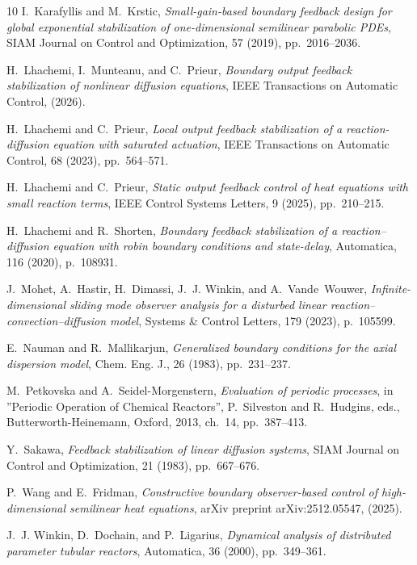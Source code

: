 \documentclass{mpi2015-cscpreprint}
\numberwithin{equation}{section}
\begin{document}
\begin{thebibliography}{10}
{I.~Karafyllis and M.~Krstic}, {\em Small-gain-based boundary feedback
  design for global exponential stabilization of one-dimensional semilinear
  parabolic {PDEs}}, SIAM Journal on Control and Optimization, 57 (2019),
  pp.~2016--2036.

{H.~Lhachemi, I.~Munteanu, and C.~Prieur}, {\em Boundary output feedback
  stabilization of nonlinear diffusion equations}, IEEE Transactions on
  Automatic Control,  (2026).

{H.~Lhachemi and C.~Prieur}, {\em Local output feedback stabilization of a
  reaction-diffusion equation with saturated actuation}, IEEE Transactions on
  Automatic Control, 68 (2023), pp.~564--571.

{H.~Lhachemi and C.~Prieur}, {\em Static output
  feedback control of heat equations with small reaction terms}, IEEE Control
  Systems Letters, 9 (2025), pp.~210--215.

{H.~Lhachemi and R.~Shorten}, {\em Boundary feedback stabilization of a
  reaction--diffusion equation with robin boundary conditions and state-delay},
  Automatica, 116 (2020), p.~108931.

{J.~Mohet, A.~Hastir, H.~Dimassi, J.~J. Winkin, and A.~Vande~Wouwer}, {\em
  Infinite-dimensional sliding mode observer analysis for a disturbed linear
  reaction--convection--diffusion model}, Systems \& Control Letters, 179
  (2023), p.~105599.

{E.~Nauman and R.~Mallikarjun}, {\em Generalized boundary conditions for
  the axial dispersion model}, Chem. Eng. J., 26 (1983), pp.~231--237.

{M.~Petkovska and A.~Seidel-Morgenstern}, {\em Evaluation of periodic
  processes}, in ''Periodic Operation of Chemical Reactors'', P.~Silveston and
  R.~Hudgins, eds., Butterworth-Heinemann, Oxford, 2013, ch.~14, pp.~387--413.

{Y.~Sakawa}, {\em Feedback stabilization of linear diffusion systems}, SIAM
  Journal on Control and Optimization, 21 (1983), pp.~667--676.

{P.~Wang and E.~Fridman}, {\em Constructive boundary observer-based control
  of high-dimensional semilinear heat equations}, arXiv preprint
  arXiv:2512.05547,  (2025).

{J.~J. Winkin, D.~Dochain, and P.~Ligarius}, {\em Dynamical analysis of
  distributed parameter tubular reactors}, Automatica, 36 (2000), pp.~349--361.


\end{thebibliography}
\end{document}
